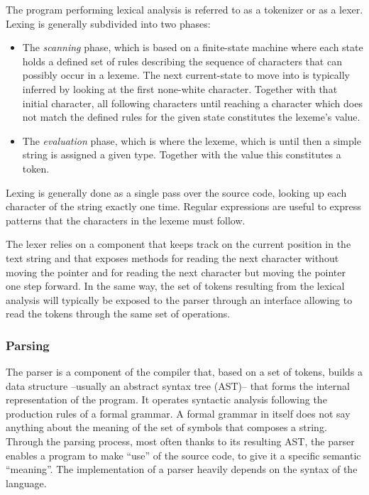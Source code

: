 The program performing lexical analysis is referred to as a tokenizer or as a lexer.
Lexing is generally subdivided into two phases: 
\begin{itemize}
    \item The \emph{scanning} phase, which is based on a finite-state machine where each state holds a defined set of rules describing the sequence of characters that can possibly occur in a lexeme. The next current-state to move into is typically inferred by looking at the first none-white character. Together with that initial character, all following characters until reaching a character which does not match the defined rules for the given state constitutes the lexeme's value. 
    \item The \emph{evaluation} phase, which is where the lexeme, which is until then a simple string is assigned a given type. Together with the value this constitutes a token.
\end{itemize}

Lexing is generally done as a single pass over the source code, looking up each character of the string exactly one time. Regular expressions are useful to express patterns that the characters in the lexeme must follow.

The lexer relies on a component that keeps track on the current position in the text string and that exposes methods for reading the next character without moving the pointer and for reading the next character but moving the pointer one step forward. In the same way, the set of tokens resulting from the lexical analysis will typically be exposed to the parser through an interface allowing to read the tokens through the same set of operations.

\subsubsection{Parsing}

The parser is a component of the compiler that, based on a set of tokens, builds a data structure --usually an abstract syntax tree (AST)-- that forms the internal representation of the program. It operates syntactic analysis following the production rules of a formal grammar. A formal grammar in itself does not say anything about the meaning of the set of symbols that composes a string. Through the parsing process, most often thanks to its resulting AST, the parser enables a program to make ``use'' of the source code, to give it a specific semantic ``meaning''. The implementation of a parser heavily depends on the syntax of the language.

